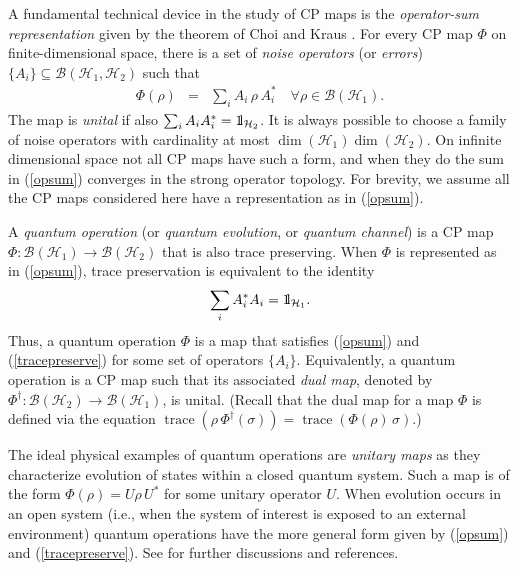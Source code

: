 \documentclass[12pt]{amsart}
\theoremstyle{plain}
\theoremstyle{definition}
\newcommand{\B}{{\mathcal{B}}}
\renewcommand{\H}{{\mathcal{H}}}
\newcommand{\trace}{\operatorname{trace}}
\def\one{{\mathchoice{\rm 1\mskip-4mu l}{\rm 1\mskip-4mu l}{\rm 1\mskip-4.5mu l}{\rm
1\mskip-5mu l}}}
\begin{document}
A fundamental technical device in the study of CP maps is the {\it
operator-sum representation} given by the theorem of Choi
\cite{Choi} and Kraus \cite{Kraus}. For every CP map $\Phi$ on
finite-dimensional space, there is a set of {\it noise operators}
(or {\it errors}) $\{A_i\}\subseteq \B(\H_1,\H_2)$ such that
\begin{eqnarray}\label{opsum}
\Phi(\rho) &=& \sum_i A_i\, \rho\, A_i^* \quad\forall
\rho\in\B(\H_1).
\end{eqnarray}
The map is {\it unital} if also $\sum_i A_i A_i^* = \one_{\H_2}$.
It is always possible to choose a family of noise operators with
cardinality at most $\dim(\H_1)\dim(\H_2)$. On infinite
dimensional space not all CP maps have such a form, and when they
do the sum in (\ref{opsum}) converges in the strong operator
topology. For brevity, we assume all the CP maps considered here
have a representation as in (\ref{opsum}).

A {\it quantum operation} (or {\it quantum evolution}, or {\it
quantum channel}) is a CP map $\Phi : \B(\H_1)\rightarrow\B(\H_2)$
that is also trace preserving. When $\Phi$ is represented as in
(\ref{opsum}), trace preservation is equivalent to the identity
\begin{eqnarray}\label{tracepreserve}
 \sum_i A_i^*  A_i = \one_{\H_1}.
\end{eqnarray}
Thus, a quantum operation $\Phi$ is a map that satisfies
(\ref{opsum}) and (\ref{tracepreserve}) for some set of operators
$\{A_i\}$. Equivalently, a quantum operation is a CP map such that
its associated {\it dual map}, denoted by $\Phi^\dagger:
\B(\H_2)\rightarrow\B(\H_1)$, is unital. (Recall that the dual map
for a map $\Phi$ is defined via the equation
$\trace(\rho\,\Phi^\dagger(\sigma)) =
\trace(\Phi(\rho)\,\sigma)$.)

The ideal physical examples of quantum operations are {\it unitary
maps}  as they characterize evolution of states within a closed
quantum system. Such a map is of the form $\Phi(\rho) = U \rho\,
U^*$ for some unitary operator $U$. When evolution occurs in an
open system (i.e., when the system of interest is exposed to an
external environment) quantum operations have the more general
form given by (\ref{opsum}) and (\ref{tracepreserve}). See
\cite{Ksurvey} for further discussions and references.
\end{document}

